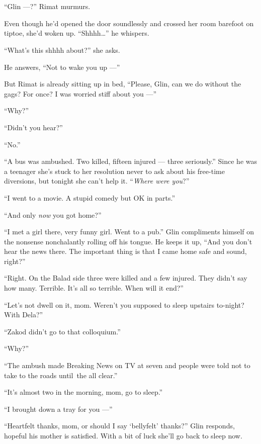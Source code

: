 \documentclass[twoside,11pt,openany]{book}
\begin{document}
\chapter{}

``Glin ---?'' Rimat murmurs.

Even though he'd opened the door soundlessly and crossed her room barefoot on tiptoe, she'd woken up.
``Shhhh{\ldots}'' he whispers.

``What's this shhhh about?'' she asks.

He answers, ``Not to wake you up ---''

But Rimat is already sitting up in bed, ``Please, Glin, can we do without the gags? For once? I was worried
stiff about you ---''

``Why?''

``Didn't you hear?''

``No.''

``A bus was ambushed. Two killed, fifteen injured --- three seriously.'' Since he was a teenager
she's stuck to her resolution never{ }to ask about his
free-time diversions, but tonight she can't help it.
``\textit{Where were you}?''

``I went to a movie. A stupid comedy but OK in parts.''

``And only \textit{now} you got home?''

``I met a girl there, very funny girl. Went to a pub.'' Glin compliments himself on the
nonsense nonchalantly rolling off his tongue. He keeps it up, ``And you don't hear the news there. The
important thing is that I came home safe and sound, right?''

``Right. On the Balad side three were killed and a few injured. They didn't say how many. Terrible. It's
all so terrible. When will it end?''

``Let's not dwell on it, mom. Weren't you supposed to sleep upstairs to-night? With Dela?''

``Zakod didn't go to that colloquium.''

``Why?''

``The ambush made Breaking News on TV at seven and people were told not to take to the roads until~the all
clear.''

``It's almost two in the morning, mom, go to sleep.''

``I brought down a tray for you ---''

``Heartfelt thanks, mom, or should I say `bellyfelt' thanks?'' Glin responds, hopeful his
mother is satisfied. With a bit of luck she'll go back to sleep now.
\end{document}
